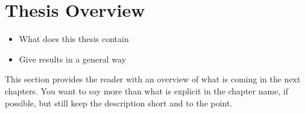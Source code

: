 \section{Thesis Overview}

\begin{itemize}
\item What does this thesis contain
\item Give results in a general way
\end{itemize}

This section provides the reader with an overview of what is coming in the next
chapters. You want to say more than what is explicit in the chapter name, if
possible, but still keep the description short and to the point.